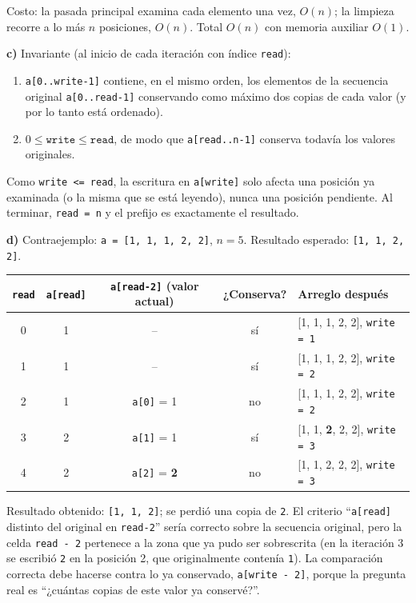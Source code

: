 \documentclass[11pt,a4paper]{article}
\begin{document}
Costo: la pasada principal examina cada elemento una vez, $O(n)$; la limpieza recorre a lo más $n$ posiciones, $O(n)$. Total $O(n)$ con memoria auxiliar $O(1)$.

\textbf{c)} Invariante (al inicio de cada iteración con índice \texttt{read}):
\begin{enumerate}[itemsep=0pt]
\item \texttt{a[0..write-1]} contiene, en el mismo orden, los elementos de la secuencia original \texttt{a[0..read-1]} conservando como máximo dos copias de cada valor (y por lo tanto está ordenado).
\item $0 \le \texttt{write} \le \texttt{read}$, de modo que \texttt{a[read..n-1]} conserva todavía los valores originales.
\end{enumerate}
Como \texttt{write <= read}, la escritura en \texttt{a[write]} solo afecta una posición ya examinada (o la misma que se está leyendo), nunca una posición pendiente. Al terminar, \texttt{read = n} y el prefijo es exactamente el resultado.

\textbf{d)} Contraejemplo: \texttt{a = [1, 1, 1, 2, 2]}, $n = 5$. Resultado esperado: \texttt{[1, 1, 2, 2]}.

\begin{center}
\small
\begin{tabular}{ccccl}
\toprule
\texttt{read} & \texttt{a[read]} & \texttt{a[read-2]} (valor actual) & ¿Conserva? & Arreglo después \\
\midrule
0 & 1 & -- & sí & [1, 1, 1, 2, 2], \texttt{write = 1} \\
1 & 1 & -- & sí & [1, 1, 1, 2, 2], \texttt{write = 2} \\
2 & 1 & \texttt{a[0]} = 1 & no & [1, 1, 1, 2, 2], \texttt{write = 2} \\
3 & 2 & \texttt{a[1]} = 1 & sí & [1, 1, \textbf{2}, 2, 2], \texttt{write = 3} \\
4 & 2 & \texttt{a[2]} = \textbf{2} & no & [1, 1, 2, 2, 2], \texttt{write = 3} \\
\bottomrule
\end{tabular}
\end{center}

Resultado obtenido: \texttt{[1, 1, 2]}; se perdió una copia de \texttt{2}. El criterio ``\texttt{a[read]} distinto del original en \texttt{read-2}'' sería correcto sobre la secuencia original, pero la celda \texttt{read - 2} pertenece a la zona que ya pudo ser sobrescrita (en la iteración 3 se escribió \texttt{2} en la posición 2, que originalmente contenía \texttt{1}). La comparación correcta debe hacerse contra lo ya conservado, \texttt{a[write - 2]}, porque la pregunta real es ``¿cuántas copias de este valor ya conservé?''.
\end{document}

